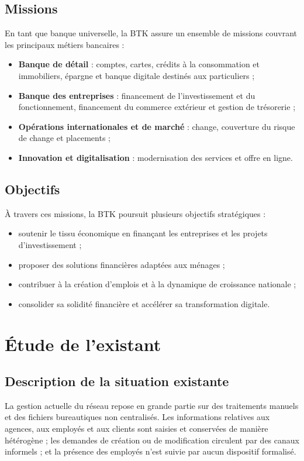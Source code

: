 \subsection{Missions}
En tant que banque universelle, la BTK assure un ensemble de missions couvrant
les principaux métiers bancaires :
\begin{itemize}[noitemsep]
  \item \textbf{Banque de détail} : comptes, cartes, crédits à la consommation et
        immobiliers, épargne et banque digitale destinés aux particuliers ;
  \item \textbf{Banque des entreprises} : financement de l'investissement et du
        fonctionnement, financement du commerce extérieur et gestion de
        trésorerie ;
  \item \textbf{Opérations internationales et de marché} : change, couverture du
        risque de change et placements ;
  \item \textbf{Innovation et digitalisation} : modernisation des services et
        offre en ligne.
\end{itemize}

\subsection{Objectifs}
À travers ces missions, la BTK poursuit plusieurs objectifs stratégiques :
\begin{itemize}[noitemsep]
  \item soutenir le tissu économique en finançant les entreprises et les projets
        d'investissement ;
  \item proposer des solutions financières adaptées aux ménages ;
  \item contribuer à la création d'emplois et à la dynamique de croissance
        nationale ;
  \item consolider sa solidité financière et accélérer sa transformation
        digitale.
\end{itemize}

\section{Étude de l'existant}

\subsection{Description de la situation existante}
La gestion actuelle du réseau repose en grande partie sur des traitements manuels
et des fichiers bureautiques non centralisés. Les informations relatives aux
agences, aux employés et aux clients sont saisies et conservées de manière
hétérogène ; les demandes de création ou de modification circulent par des canaux
informels ; et la présence des employés n'est suivie par aucun dispositif
formalisé.

